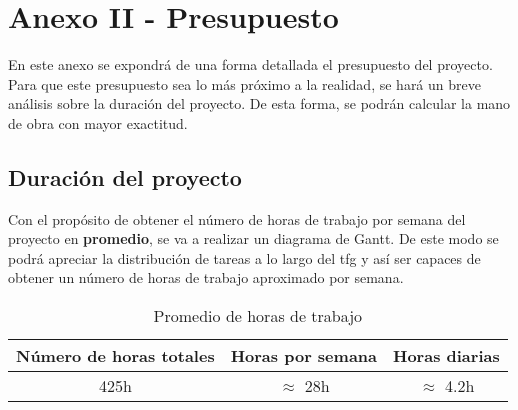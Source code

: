 \chapter{Anexo II - Presupuesto}

En este anexo se expondrá de una forma detallada el presupuesto del proyecto. Para que este presupuesto sea lo más próximo a la realidad, se hará un breve análisis sobre la duración del proyecto. De esta forma, se podrán calcular la mano de obra con mayor exactitud. 

\section{Duración del proyecto}

Con el propósito de obtener el número de horas de trabajo por semana del proyecto en \textbf{promedio}, se va a realizar un diagrama de Gantt. De este modo se podrá apreciar la distribución de tareas a lo largo del \gls{tfg} y así ser capaces de obtener un número de horas de trabajo aproximado por semana.

\begin{figure}[htb]
\begin{center}
\end{center}
\label{gantt}
\end{figure}

\begin{table}[ht]
\centering
\begin{tabular}{|c|c|c|}
\hline
\rowcolor[HTML]{EFEFEF} 
\textbf{Número de horas totales} & \textbf{Horas por semana} & \textbf{Horas diarias} \\ \hline
425h                             & $\approx$ 28h                   & $\approx$ 4.2h              \\ \hline
\end{tabular}
\caption{Promedio de horas de trabajo }
\label{dig:horasTrabajadas}
\end{table}

